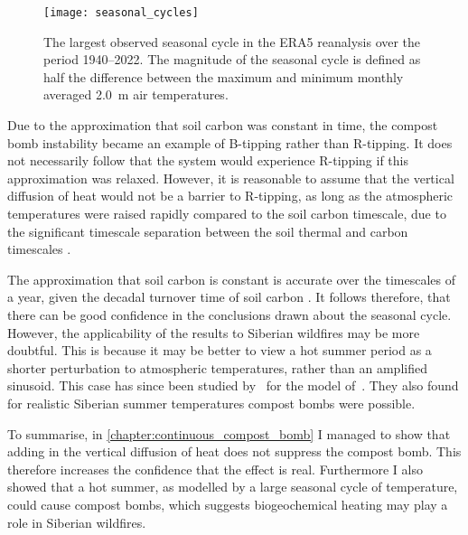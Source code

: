 \begin{figure}
  \centering
  \texttt{[image: seasonal\_cycles]}
  \caption[Map of Seasonal Cycles]{The largest observed seasonal cycle in the ERA5 reanalysis \parencite{Hersbach2020} over the period 1940--2022.
    The magnitude of the seasonal cycle is defined as half the difference between the maximum and minimum monthly averaged \SI{2.0}{\meter} air temperatures.}
  \label{fig:seasonal_cycle_maps}
\end{figure}

Due to the approximation that soil carbon was constant in time, the compost bomb instability became an example of B-tipping rather than R-tipping. It does not necessarily
follow that the system would experience R-tipping if this approximation was relaxed. However, it is reasonable to assume that the vertical diffusion of heat would not be a barrier to
R-tipping, as long as the atmospheric temperatures were raised rapidly compared to the soil carbon timescale, due to the significant timescale separation between the soil thermal and
carbon timescales \parencite{Luke2011}.

The approximation that soil carbon is constant is accurate over the timescales of a year, given the decadal turnover time of soil carbon \parencite{Varney2020}.
It follows therefore, that there can be good confidence in the conclusions drawn about the seasonal cycle. However, the applicability of the results to Siberian wildfires may be more doubtful.
This is because it may be better to view a hot summer period as a shorter perturbation to atmospheric temperatures, rather than an amplified sinusoid. This case has
since been studied by~\cite{OSullivan2023} for the model of~\cite{Luke2011}. They also found for realistic Siberian summer temperatures compost bombs were possible. 

To summarise, in \cref{chapter:continuous_compost_bomb} I managed to show that adding in the vertical diffusion of heat does not suppress the compost bomb. This therefore increases the confidence
that the effect is real. Furthermore I also showed that a hot summer, as modelled by a large seasonal cycle of temperature, could cause compost bombs, which suggests biogeochemical heating may
play a role in Siberian wildfires.

\subsubsection{}

